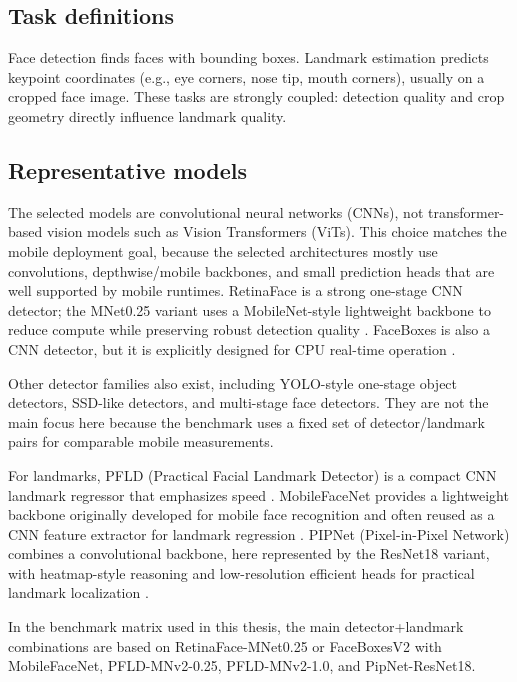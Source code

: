 \subsection{Task definitions}

Face detection finds faces with bounding boxes. Landmark estimation predicts
keypoint coordinates (e.g., eye corners, nose tip, mouth corners), usually on a
cropped face image. These tasks are strongly coupled:
detection quality and crop geometry directly influence landmark quality.

\subsection{Representative models}

The selected models are convolutional neural networks (CNNs), not
transformer-based vision models such as Vision Transformers (ViTs). This choice
matches the mobile deployment goal, because the selected architectures mostly use
convolutions, depthwise/mobile backbones, and small prediction heads that are
well supported by mobile runtimes. RetinaFace is a strong one-stage CNN detector;
the MNet0.25 variant uses a MobileNet-style lightweight backbone to reduce
compute while preserving robust detection quality
\cite{deng2020retinaface,retinaface_repo}. FaceBoxes is also a CNN detector, but
it is explicitly designed for CPU real-time operation
\cite{zhang2017faceboxes,faceboxesv2_repo}.

Other detector families also exist, including YOLO-style one-stage object
detectors, SSD-like detectors, and multi-stage face detectors. They are not the
main focus here because the benchmark uses a fixed set of detector/landmark
pairs for comparable mobile measurements.

For landmarks, PFLD (Practical Facial Landmark Detector) is a compact CNN
landmark regressor that emphasizes speed \cite{guo2019pfld,pfld68_repo}.
MobileFaceNet provides a lightweight backbone originally developed for mobile
face recognition and often reused as a CNN feature extractor for landmark
regression \cite{chen2018mobilefacenets,mobilefacenet_pytorch_repo}. PIPNet
(Pixel-in-Pixel Network) combines a convolutional backbone, here represented by
the ResNet18 variant, with heatmap-style reasoning and low-resolution efficient
heads for practical landmark localization
\cite{jin2021pipnet,pipnet_repo}.

In the benchmark matrix used in this thesis, the main detector+landmark
combinations are based on RetinaFace-MNet0.25 or FaceBoxesV2 with
MobileFaceNet, PFLD-MNv2-0.25, PFLD-MNv2-1.0, and PipNet-ResNet18.

